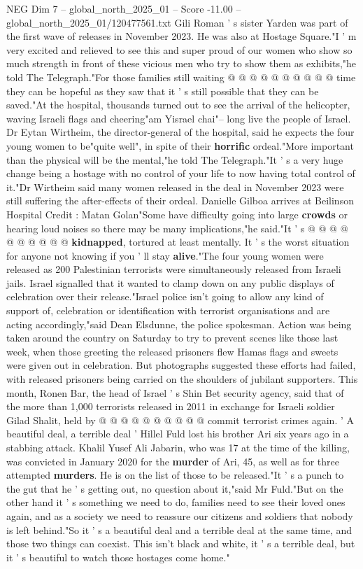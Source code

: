 \begin{textsample}{NEG Dim 7 – global\_north\_2025\_01 – Score -11.00 – global\_north\_2025\_01/120477561.txt}
Gili Roman ' s sister Yarden was part of the first wave of releases in November 2023.
He was also at Hostage Square."I ' m very excited and relieved to see this and super proud of our women who show so much strength in front of these vicious men who try to show them as exhibits,"he told The Telegraph."For those families still waiting @ @ @ @ @ @ @ @ @ @ time they can be hopeful as they saw that it ' s still possible that they can be saved."At the hospital, thousands turned out to see the arrival of the helicopter, waving Israeli flags and cheering"am Yisrael chai"-- long live the people of Israel.
Dr Eytan Wirtheim, the director-general of the hospital, said he expects the four young women to be"quite well", in spite of their \textbf{horrific} ordeal."More important than the physical will be the mental,"he told The Telegraph."It ' s a very huge change being a hostage with no control of your life to now having total control of it."Dr Wirtheim said many women released in the deal in November 2023 were still suffering the after-effects of their ordeal.
Danielle Gilboa arrives at Beilinson Hospital Credit : Matan Golan"Some have difficulty going into large \textbf{crowds} or hearing loud noises so there may be many implications,"he said."It ' s @ @ @ @ @ @ @ @ @ @ \textbf{kidnapped}, tortured at least mentally.
It ' s the worst situation for anyone not knowing if you ' ll stay \textbf{alive}."The four young women were released as 200 Palestinian terrorists were simultaneously released from Israeli jails.
Israel signalled that it wanted to clamp down on any public displays of celebration over their release."Israel police isn't going to allow any kind of support of, celebration or identification with terrorist organisations and are acting accordingly,"said Dean Elsdunne, the police spokesman.
Action was being taken around the country on Saturday to try to prevent scenes like those last week, when those greeting the released prisoners flew Hamas flags and sweets were given out in celebration.
But photographs suggested these efforts had failed, with released prisoners being carried on the shoulders of jubilant supporters.
This month, Ronen Bar, the head of Israel ' s Shin Bet security agency, said that of the more than 1,000 terrorists released in 2011 in exchange for Israeli soldier Gilad Shalit, held by @ @ @ @ @ @ @ @ @ @ commit terrorist crimes again. ' A beautiful deal, a terrible deal ' Hillel Fuld lost his brother Ari six years ago in a stabbing attack.
Khalil Yusef Ali Jabarin, who was 17 at the time of the killing, was convicted in January 2020 for the \textbf{murder} of Ari, 45, as well as for three attempted \textbf{murders}.
He is on the list of those to be released."It ' s a punch to the gut that he ' s getting out, no question about it,"said Mr Fuld."But on the other hand it ' s something we need to do, families need to see their loved ones again, and as a society we need to reassure our citizens and soldiers that nobody is left behind."So it ' s a beautiful deal and a terrible deal at the same time, and those two things can coexist.
This isn't black and white, it ' s a terrible deal, but it ' s beautiful to watch those hostages come home."


\end{textsample}
